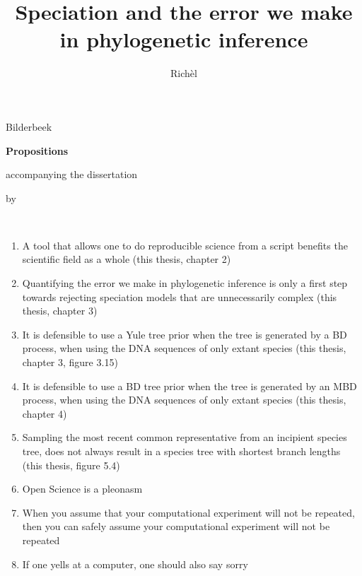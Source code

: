 \documentclass{propositions}
\begin{document}
\title{Speciation and the error we make in phylogenetic inference}
\author{Richèl}{Bilderbeek}

\begin{center}

{\Large\titlefont\bfseries Propositions}

\bigskip

accompanying the dissertation

\bigskip

{\makeatletter
\titlestyle\bfseries\large\@title
\makeatother}

{\makeatletter
\ifx\@subtitle\undefined\else
    \titlefont\titleshape\@subtitle
\fi
\makeatother}

\bigskip

by

\bigskip

\makeatletter
{\large\titlefont\bfseries\@firstname\ {\titleshape\@lastname}}
\makeatother

\end{center}

\bigskip
\bigskip

\begin{enumerate}
  \item A tool that allows one to do reproducible science from a script
        benefits the scientific field as a whole (this thesis, chapter 2)
  \item Quantifying the error we make in phylogenetic inference is
        only a first step towards rejecting speciation models that are
        unnecessarily complex (this thesis, chapter 3)
  \item It is defensible to use a Yule tree prior when the tree
        is generated by a BD process, when using the DNA sequences
        of only extant species (this thesis, chapter 3, figure 3.15)
  \item It is defensible to use a BD tree prior when the tree
        is generated by an MBD process, when using the DNA sequences
        of only extant species (this thesis, chapter 4)
  \item Sampling the most recent common representative from an incipient
        species tree, does not always result in a species tree with shortest
        branch lengths (this thesis, figure 5.4)
  \item Open Science is a pleonasm
  \item When you assume that your computational experiment will not be repeated,
        then you can safely assume your computational experiment will not be repeated
  \item If one yells at a computer, one should also say sorry
\end{enumerate}
\end{document}
